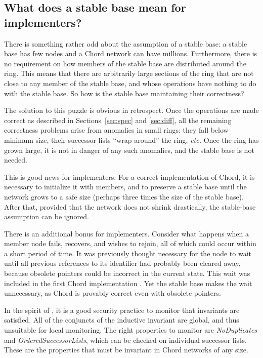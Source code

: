 \documentclass[conference]{IEEEtran}
\begin{document}
\subsection{What does a stable base mean for implementers?}

There is something rather odd about the assumption of a stable base:
a stable base has few nodes and a Chord network can have millions.
Furthermore, there is no requirement on how members of the
stable base are distributed around the ring.
This means that there are arbitrarily large sections of the ring that
are not close to any member of the stable base, and whose operations
have nothing to do with the stable base.
So how is the stable base maintaining their correctness?

The solution to this puzzle is obvious in retrospect.
Once the operations are made correct
as described in Sections~\ref{sec:spec}
and \ref{sec:diff}, 
all the remaining correctness problems arise from anomalies in
small rings:
they fall below minimum size, their successor lists ``wrap around''
the ring, {\it etc.}
Once the ring has grown large, it is not in danger of any such
anomalies, and the stable base is not needed.

This is good news for implementers.
For a correct implementation of Chord, it is necessary to initialize
it with  members, and to preserve a stable base until the
network grows to a safe size (perhaps three times the size of the
stable base).
After that, provided that the network does not shrink drastically,
the stable-base assumption can be ignored.

There is an additional bonus for implementers.
Consider what happens when a
member node fails, recovers, and
wishes to rejoin, all of which could occur within a short period of
time.
It was previously thought necessary
for the node to wait until all
previous references to its identifier had probably been 
cleared away, because obsolete pointers could be incorrect in the
current state. 
This wait was included in the first Chord
implementation \cite{excuses}.
Yet the stable base makes the wait unnecessary, as Chord is provably
correct even with obsolete pointers.

In the spirit of \cite{sitmorris}, it is a good security practice
to monitor that invariants are satisfied.
All of the conjuncts of the inductive invariant are global, and thus
unsuitable for local monitoring.
The right properties to monitor are {\it NoDuplicates} and
{\it OrderedSuccessorLists}, which
can be checked on individual successor lists.
These are the properties that must be invariant in Chord networks of
any size.
\end{document}
